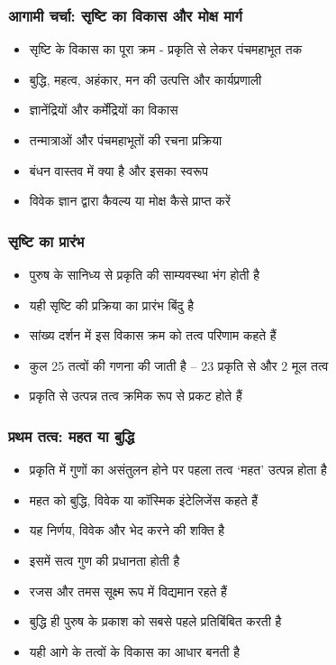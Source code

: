 \begin{frame}[fragile]\frametitle{आगामी चर्चा: सृष्टि का विकास और मोक्ष मार्ग}
      \begin{itemize}
	\item सृष्टि के विकास का पूरा क्रम - प्रकृति से लेकर पंचमहाभूत तक
	\item बुद्धि, महत्व, अहंकार, मन की उत्पत्ति और कार्यप्रणाली
	\item ज्ञानेंद्रियों और कर्मेंद्रियों का विकास
	\item तन्मात्राओं और पंचमहाभूतों की रचना प्रक्रिया
	\item बंधन वास्तव में क्या है और इसका स्वरूप
	\item विवेक ज्ञान द्वारा कैवल्य या मोक्ष कैसे प्राप्त करें
	  \end{itemize}
\end{frame}


\begin{frame}[fragile]\frametitle{सृष्टि का प्रारंभ}
\begin{itemize}
  \item पुरुष के सानिध्य से प्रकृति की साम्यवस्था भंग होती है
  \item यही सृष्टि की प्रक्रिया का प्रारंभ बिंदु है
  \item सांख्य दर्शन में इस विकास क्रम को तत्व परिणाम कहते हैं
  \item कुल 25 तत्वों की गणना की जाती है – 23 प्रकृति से और 2 मूल तत्व
  \item प्रकृति से उत्पन्न तत्व क्रमिक रूप से प्रकट होते हैं
\end{itemize}
\end{frame}

\begin{frame}[fragile]\frametitle{प्रथम तत्व: महत या बुद्धि}
\begin{itemize}
  \item प्रकृति में गुणों का असंतुलन होने पर पहला तत्व ‘महत’ उत्पन्न होता है
  \item महत को बुद्धि, विवेक या कॉस्मिक इंटेलिजेंस कहते हैं
  \item यह निर्णय, विवेक और भेद करने की शक्ति है
  \item इसमें सत्व गुण की प्रधानता होती है
  \item रजस और तमस सूक्ष्म रूप में विद्यमान रहते हैं
  \item बुद्धि ही पुरुष के प्रकाश को सबसे पहले प्रतिबिंबित करती है
  \item यही आगे के तत्वों के विकास का आधार बनती है
\end{itemize}
\end{frame}

